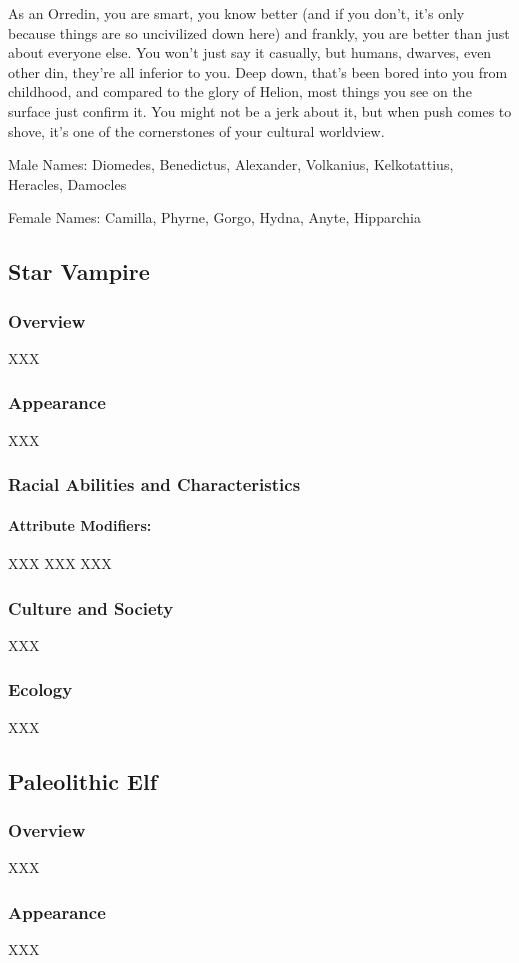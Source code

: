 \documentclass[oneside,11pt,english]{book}
\begin{document}
As an Orredin, you are smart, you know better (and if you don’t, it’s only because things are so 
uncivilized down here) and frankly, you are better than just about everyone else. You won’t just say it 
casually, but humans, dwarves, even other din, they’re all inferior to you. Deep down, that’s been bored 
into you from childhood, and compared to the glory of Helion, most things you see on the surface just 
confirm it. You might not be a jerk about it, but when push comes to shove, it’s one of the cornerstones of 
your cultural worldview. 


Male Names: Diomedes, Benedictus, Alexander, Volkanius, Kelkotattius, Heracles, Damocles 

Female Names: Camilla, Phyrne, Gorgo, Hydna, Anyte, Hipparchia 
\subsection{Star Vampire}
\subsubsection*{Overview} 
XXX 
\subsubsection*{Appearance} 
XXX 
\subsubsection*{Racial Abilities and Characteristics} 
\paragraph{Attribute Modifiers:} XXX
XXX 
XXX 
\subsubsection*{Culture and Society} 
XXX 
\subsubsection*{Ecology} 
XXX 
\subsection{Paleolithic Elf}
\subsubsection*{Overview} 
XXX 
\subsubsection*{Appearance} 
XXX 
\end{document}
